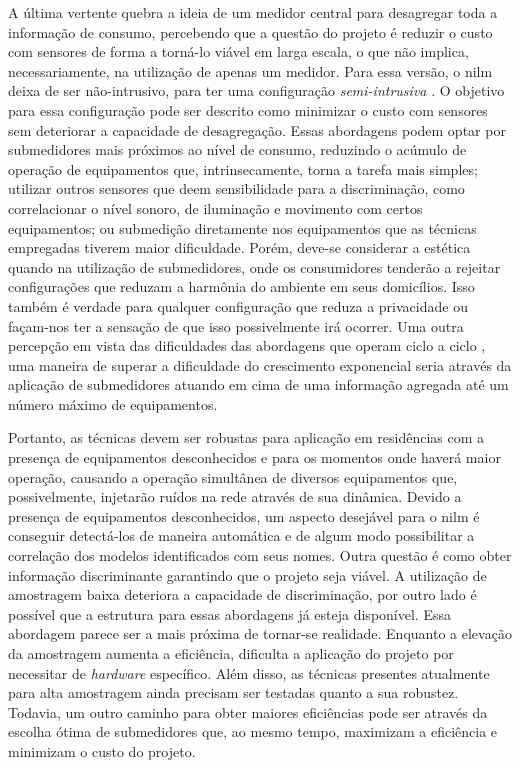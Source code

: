 A última vertente quebra a ideia de um medidor central para desagregar
toda a informação de consumo, percebendo que a questão do projeto é
reduzir o custo com sensores de forma a torná-lo viável em larga
escala, o que não implica, necessariamente, na utilização de apenas um
medidor. Para essa versão, o \gls{nilm} deixa de ser não-intrusivo,
para ter uma configuração \emph{semi-intrusiva}
\cite{seminilm_ihome_tomek_2012,seminilm_fhmm_empiricalnmeter_2013,
seminilm_berges_multisensor_2010}. O objetivo para essa configuração
pode ser descrito como minimizar o custo com sensores sem deteriorar a
capacidade de desagregação. Essas abordagens podem optar por
submedidores mais próximos ao nível de consumo, reduzindo o
acúmulo de operação de equipamentos que, intrinsecamente, torna a tarefa mais
simples; utilizar outros sensores que deem sensibilidade para a
discriminação, como correlacionar o nível sonoro, de iluminação e
movimento com certos equipamentos; ou submedição diretamente nos
equipamentos que as técnicas empregadas tiverem maior dificuldade. Porém,
deve-se considerar a estética quando na utilização de submedidores,
onde os consumidores tenderão a rejeitar configurações que reduzam a
harmônia do ambiente em seus domicílios. Isso também é verdade para
qualquer configuração que reduza a privacidade ou façam-nos ter a
sensação de que isso possivelmente irá ocorrer. Uma outra percepção em
vista das dificuldades das abordagens que operam ciclo a ciclo 
\cite{nilm_srinivasan_nn_2006_27,
nilm_itajuba_rodrigues,nilm_suzuki_2011_35}, uma maneira de superar a
dificuldade do crescimento exponencial seria através da aplicação de
submedidores atuando em cima de uma informação agregada até um número
máximo de equipamentos.

Portanto, as técnicas devem ser robustas para aplicação em residências
com a presença de equipamentos desconhecidos e para os momentos onde
haverá maior operação, causando a operação simultânea de diversos equipamentos
que, possivelmente, injetarão ruídos na rede através de sua dinâmica.
Devido a presença de equipamentos desconhecidos, um aspecto desejável para
o \gls{nilm} é conseguir detectá-los de maneira automática e de algum
modo possibilitar a correlação dos modelos identificados com seus
nomes. Outra questão é como obter informação discriminante garantindo
que o projeto seja viável. A utilização de amostragem baixa deteriora
a capacidade de discriminação, por outro lado é possível que a
estrutura para essas abordagens já esteja disponível. Essa abordagem
parece ser a mais próxima de tornar-se realidade. Enquanto a elevação
da amostragem aumenta a eficiência, dificulta a aplicação do projeto
por necessitar de \emph{hardware} específico. Além disso, as técnicas
presentes atualmente para alta amostragem ainda precisam ser testadas
quanto a sua robustez. Todavia, um outro caminho para obter maiores
eficiências pode ser através da escolha ótima de submedidores que, ao
mesmo tempo, maximizam a eficiência e minimizam o custo do projeto.

